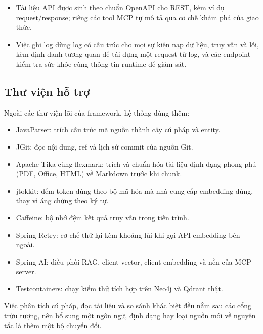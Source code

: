 \begin{itemize}
  \item Tài liệu API được sinh theo chuẩn OpenAPI cho REST, kèm ví dụ request/response; riêng các tool MCP tự mô tả qua cơ chế khám phá của giao thức.
  \item Việc ghi log dùng log có cấu trúc cho mọi sự kiện nạp dữ liệu, truy vấn và lỗi, kèm định danh tương quan để tái dựng một request từ log, và các endpoint kiểm tra sức khỏe cùng thông tin runtime để giám sát.
\end{itemize}

\subsection{Thư viện hỗ trợ}

Ngoài các thư viện lõi của framework, hệ thống dùng thêm:

\begin{itemize}
  \item JavaParser: trích cấu trúc mã nguồn thành cây cú pháp và entity.
  \item JGit: đọc nội dung, ref và lịch sử commit của nguồn Git.
  \item Apache Tika cùng flexmark: trích và chuẩn hóa tài liệu định dạng phong phú (PDF, Office, HTML) về Markdown trước khi chunk.
  \item jtokkit: đếm token đúng theo bộ mã hóa mà nhà cung cấp embedding dùng, thay vì áng chừng theo ký tự.
  \item Caffeine: bộ nhớ đệm kết quả truy vấn trong tiến trình.
  \item Spring Retry: cơ chế thử lại kèm khoảng lùi khi gọi API embedding bên ngoài.
  \item Spring AI: điều phối RAG, client vector, client embedding và nền của MCP server.
  \item Testcontainers: chạy kiểm thử tích hợp trên Neo4j và Qdrant thật.
\end{itemize}

Việc phân tích cú pháp, đọc tài liệu và so sánh khác biệt đều nằm sau các cổng trừu tượng, nên bổ sung một ngôn ngữ, định dạng hay loại nguồn mới về nguyên tắc là thêm một bộ chuyển đổi.
